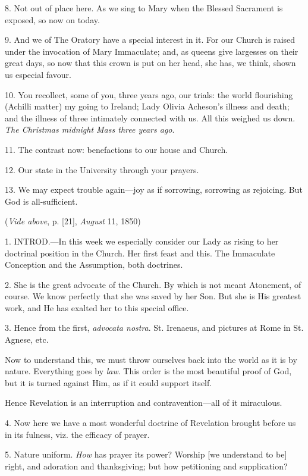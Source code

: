 8. Not out of place here. As we sing to Mary when
the Blessed Sacrament is exposed, so now on today.

9. And we of The Oratory have a special interest
in it. For our Church is raised under the invocation of Mary
Immaculate; and, as queens give largesses on their great days, so now
that this crown is put on her head, she has, we think, shown us
especial favour.

10. You recollect, some of you, three years ago,
our trials: the world flourishing (Achilli matter) my going to
Ireland; Lady Olivia Acheson's illness and death; and the illness of
three intimately connected with us. All this weighed us down. \emph{The
Christmas midnight Mass three years ago}.

11. The contrast now: benefactions to our house
and Church.

12. Our state in the University through your
prayers.

13. We may expect trouble again—joy as if
sorrowing, sorrowing as rejoicing. But God is all-sufficient.


(\emph{Vide
above}, p. [21], \emph{August} 11, 1850)

1. INTROD.—In
this week we especially consider our Lady as rising to her doctrinal
position in the Church. Her first feast and this. The Immaculate
Conception and the Assumption, both doctrines.

2. She is the great advocate of the Church. By
which is not meant Atonement, of course. We know perfectly that she
was saved by her Son. But she is His greatest work, and He has exalted
her to this special office.

3. Hence from the first, \emph{advocata nostra}.
St. Irenaeus, and pictures at Rome in St. Agnese, etc.

Now to understand this, we must throw ourselves
back into the world as it is by nature. Everything goes by \emph{law}.
This order is the most beautiful proof of God, but it is turned
against Him, as if it could support itself.

Hence Revelation is an interruption and
contravention—all of it miraculous.

4. Now here we have a most wonderful doctrine of
Revelation brought before us in its fulness, viz. the efficacy of
prayer.

5. Nature uniform. \emph{How} has prayer its
power? Worship [we understand to be] right, and adoration and
thanksgiving; but how petitioning and supplication?

